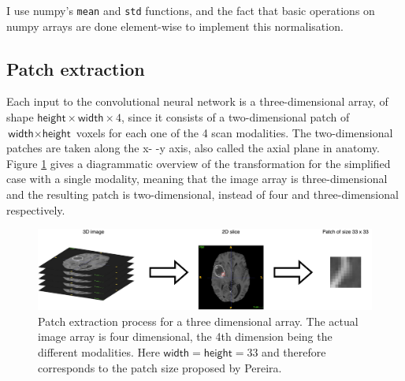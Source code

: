 \documentclass[12pt,a4paper,twoside,openright]{report}
\begin{document}
I use numpy's \texttt{mean} and \texttt{std} functions, and the fact that basic operations on numpy arrays are done element-wise to implement this normalisation.

\subsection{Patch extraction}
\label{section:patch_extraction}
Each input to the convolutional neural network is a three-dimensional array, of shape $\textsf{height} \times \textsf{width} \times 4$, since it consists of a two-dimensional patch of $\textsf{width} \times \textsf{height}$ voxels for each one of the 4 scan modalities. The two-dimensional patches are taken along the x- -y axis, also called the axial plane in anatomy. Figure \ref{fig:patch_extraction} gives a diagrammatic overview of the transformation for the simplified case with a single modality, meaning that the image array is three-dimensional and the resulting patch is two-dimensional, instead of four and three-dimensional respectively.
\begin{figure}
	\centering
	\includegraphics[width=\textwidth]{patch_extraction}
	\caption[Patch extraction process for a three dimensional array.]{Patch extraction process for a three dimensional array. The actual image array is four dimensional, the 4th dimension being the different modalities. Here $\textsf{width}=\textsf{height}=33$ and therefore corresponds to the patch size proposed by Pereira.}
	\label{fig:patch_extraction}
\end{figure}
\end{document}
